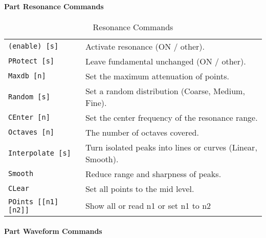 \paragraph{Part Resonance Commands}
\label{paragraph:command_line_part_resonance_commands}

   \begin{table}[H]
      \centering
      \caption{Resonance Commands}
      \label{table:part_resonance_commands}
      \begin{tabular}{l l}
   \texttt{(enable) [s]} &
      Activate resonance (ON / other). \\
    \texttt{PRotect [s]} &
      Leave fundamental unchanged (ON / other). \\
   \texttt{Maxdb [n]} &
      Set the maximum attenuation of points. \\
   \texttt{Random [s]} &
      Set a random distribution (Coarse, Medium, Fine). \\
   \texttt{CEnter [n]} &
      Set the center frequency of the resonance range. \\
   \texttt{Octaves [n]} &
      The number of octaves covered. \\
   \texttt{Interpolate [s]} &
      Turn isolated peaks into lines or curves (Linear, Smooth). \\
   \texttt{Smooth} &
      Reduce range and sharpness of peaks. \\
   \texttt{CLear} &
      Set all points to the mid level. \\
   \texttt{POints [[n1] [n2]]} &
      Show all or read n1 or set n1 to n2 \\
      \end{tabular}
   \end{table}

\paragraph{Part Waveform Commands}
\label{paragraph:command_line_part_waveform_commands}

